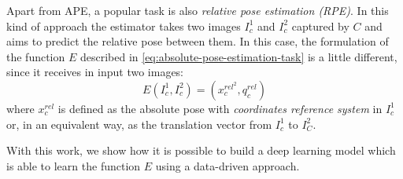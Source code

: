 Apart from APE, a popular task is also \emph{relative pose estimation (RPE)}. In this kind of approach the estimator takes two images $I_c^1$ and $I_c^2$ captured by $C$ and aims to predict the relative pose between them. In this case, the formulation of the function $E$ described in \cref{eq:absolute-pose-estimation-task} is a little different, since it receives in input two images:
\begin{equation}
    E(I_c^1, I_c^2) = (x_c^{rel^2}, q_c^{rel})
    \label{eq:relative-pose-estimation-task}
\end{equation}
where $x_c^{rel}$ is defined as the absolute pose with \emph{coordinates reference system} in $I_c^1$ or, in an equivalent way, as the translation vector from $I_c^1$ to $I_C^2$.

With this work, we show how it is possible to build a deep learning model which is able to learn the function $E$ using a data-driven approach.
